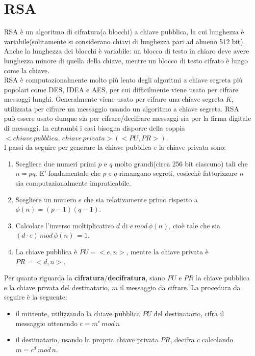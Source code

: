 \section{RSA}

RSA è un algoritmo di cifratura(a blocchi) a chiave pubblica, la cui lunghezza è variabile(solitamente si considerano chiavi di lunghezza pari ad almeno 512 bit). Anche la lunghezza dei blocchi è variabile: un blocco di testo in chiaro deve avere lunghezza minore di quella della chiave, mentre un blocco di testo cifrato è lungo come la chiave. \\
RSA è computazionalmente molto più lento degli algoritmi a chiave segreta più popolari come DES, IDEA e AES, per cui difficilmente viene usato per cifrare messaggi lunghi. Generalmente viene usato per cifrare una chiave segreta $K$, utilizzata per cifrare un messaggio usando un algoritmo a chiave segreta. RSA può essere usato dunque sia per cifrare/decifrare messaggi sia per la firma digitale di messaggi. In entrambi i casi bisogna disporre della coppia $<chiave \, pubblica, \,  chiave \, privata>(<PU,PR>)$. \\
I passi da seguire per generare la chiave pubblica e la chiave privata sono: \begin{enumerate}
\item Scegliere due numeri primi $p$ e $q$ molto grandi(circa 256 bit ciascuno) tali che $n = pq$. E' fondamentale che $p$ e $q$ rimangano segreti, cosicchè fattorizzare $n$ sia computazionalmente impraticabile. 
\item Scegliere un numero $e$ che sia relativamente primo rispetto a $\phi(n) = (p-1)(q-1)$.
\item Calcolare l'inverso moltiplicativo $d$ di $e \, mod \, \phi(n)$, cioè tale che sia $(d \cdot e ) \, mod \, \phi(n) \, = 1$.
\item La chiave pubblica è $PU = <e,n>$, mentre la chiave privata è $PR = <d,n>$.
\end{enumerate}
Per quanto riguarda la \textbf{cifratura}/\textbf{decifratura}, siano $PU$ e $PR$ la chiave pubblica e la chiave privata del destinatario, $m$ il messaggio da cifrare. La procedura da seguire è la seguente: \begin{itemize}
\item il mittente, utilizzando la chiave pubblica $PU$ del destinatario, cifra il messaggio ottenendo $c = m^e \, mod \, n$
\item il destinatario, usando la propria chiave privata $PR$, decifra $c$ calcolando $m = c^d \, mod \, n$. \end{itemize}
